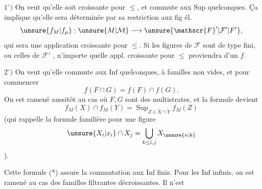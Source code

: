 $1^\circ)$ On veut qu'elle soit croissante pour $\leq$, et commute aux $\mathrm{Sup}$ quelconques. Ça implique qu'elle sera déterminée par sa restriction aux fig él.
\[
\unsure{f_M|f_\mu}:\unsure{M|\mathcal{M}}\longrightarrow\unsure{\mathscr{F}'|\mathcal{F}'|F'},
\]
qui sera une application croissante pour $\leq$. Si les figures de $\mathscr{F}$ sont de type fini, ou celles de $\mathscr{F}'$ , n'importe quelle appl.  croissante pour $\leq$ proviendra d'un $f$.

$2^\circ)$ On veut qu'elle commute aux $\mathrm{Inf}$ quelconques, à familles  non vides, et pour commencer
\[
f(F\cap G)=f(F)\cap f(G).\tag*{(*)}
\]
On est ramené aussitôt au cas où $F,G$ sont des multistrates, et la formule devient
\[
f_M(X)\cap f_M(Y)=\mathop{\mathrm{Sup}}_{Z\in\widetilde{X}\cap\widetilde{Y}}f_M(Z)\tag*{$(*_M)$}
\]
(qui rappelle la formule familière pour une figure 
\[
\unsure{X_i|x_i}\cap X_j=\bigcup_{k\leq i,j}X_{\unsure{n|k}}
\]
).

Cette formule (*) assure la commutation aux $\mathrm{Inf}$ finis. Pour les $\mathrm{Inf}$ infinis, on est ramené au cas des familles  filtrantes décroissantes. Il n'est
